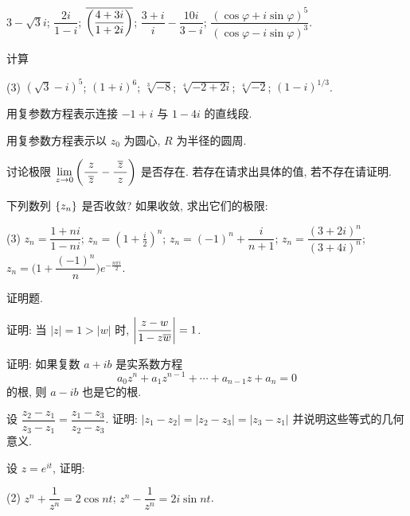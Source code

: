 \begin{homework}
\begin{exlist}
\begin{tasks}
          \task $3-\sqrt 3i$;
          \task $\dfrac{2i}{1-i}$;
          \task $\overline{\biggl(\dfrac{4+3i}{1+2i}\biggr)}$;
          \task $\dfrac{3+i}{i}-\dfrac{10i}{3-i}$;
          \task $\dfrac{(\cos \varphi+i\sin \varphi)^5}{(\cos \varphi-i\sin \varphi)^3}$.
        \end{tasks}
      \item 计算
        \begin{tasks}(3)
          \task $(\sqrt3-i)^5$;
          \task $(1+i)^6$;
          \task $\sqrt[3]{-8}$;
          \task $\sqrt[4]{-2+2i}$;
          \task $\sqrt[4]{-2}$;
          \task $(1-i)^{1/3}$.
        \end{tasks}
      \item 用复参数方程表示连接 $-1+i$ 与 $1-4i$ 的直线段.
      \item 用复参数方程表示以 $z_0$ 为圆心, $R$ 为半径的圆周.
      \item 讨论极限 $\displaystyle\lim_{z\to0}\left(\frac{z}{~\overline z~}-\frac{~\overline z~}z\right)$ 是否存在. 若存在请求出具体的值, 若不存在请证明.
      \item 下列数列 ${\left\{z_n\right\}}$ 是否收敛? 如果收敛, 求出它们的极限:
        \begin{tasks}(3)
          \task $z_n=\dfrac{1+ni}{1-ni}$;
          \task $\displaystyle z_n=\left(1+\frac i2\right)^n$;
          \task $z_n=(-1)^n+\dfrac{i}{n+1}$;
          \task $z_n=\dfrac{(3+2i)^n}{(3+4i)^n}$;
          \task $z_n=\biggl(1+\dfrac{(-1)^n}n\biggr)e^{-\frac{n\pi i}2}$.
        \end{tasks}
    \end{exlist}
  \item 证明题.
    \begin{exlist}
      \item 证明: 当 $|z|=1>|w|$ 时, $\left|\dfrac{z-w}{1-z\overline w}\right|=1$.
      \item 证明: 如果复数 $a+ib$ 是实系数方程
      	\[a_0z^n+a_1z^{n-1}+\cdots+a_{n-1}z+a_n=0\]
      	的根, 则 $a-ib$ 也是它的根.
      \item 设 $\dfrac{z_2-z_1}{z_3-z_1}=\dfrac{z_1-z_3}{z_2-z_3}$. 证明: $|z_1-z_2|=|z_2-z_3|=|z_3-z_1|$ 并说明这些等式的几何意义.
      \item 设 $z=e^{it}$, 证明:\begin{tasks}(2)
          \task $z^n+\dfrac1{z^n}=2\cos{nt}$;
          \task $z^n-\dfrac1{z^n}=2i\sin{nt}$.
        \end{tasks}
    \end{exlist}
\end{homework}



